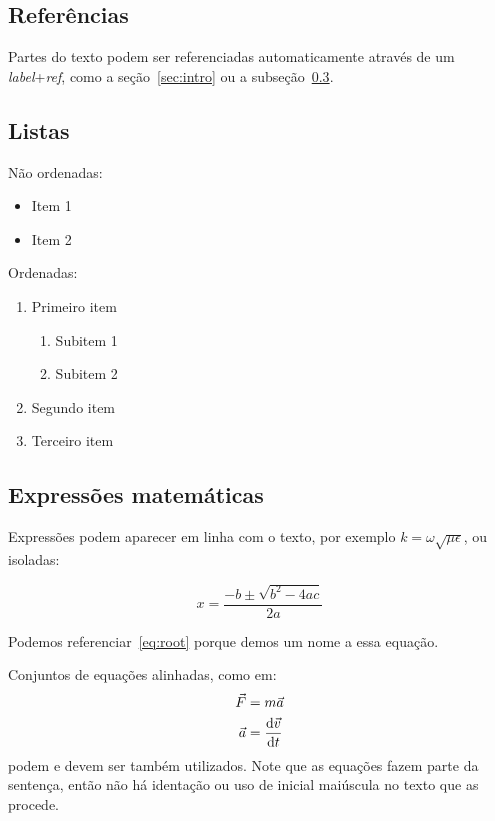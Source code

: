 \documentclass[a4paper,11pt]{article}
\begin{document}
\subsection{Referências}

Partes do texto podem ser referenciadas automaticamente através de um \emph{label}+\emph{ref}, como a seção~\ref{sec:intro} ou a subseção~\ref{ssec:math}.


\subsection{Listas}

Não ordenadas:

\begin{itemize}
	\item Item 1
	\item Item 2
\end{itemize}

Ordenadas:

\begin{enumerate}
	\item Primeiro item
	\begin{enumerate}
		\item Subitem 1
		\item Subitem 2
	\end{enumerate}
	\item Segundo item
	\item Terceiro item
\end{enumerate}


\subsection{Expressões matemáticas}
\label{ssec:math}

Expressões podem aparecer em linha com o texto, por exemplo $k = \omega \sqrt{\mu \epsilon}$, ou isoladas:

\begin{equation}
\label{eq:root}
x = \frac{-b \pm \sqrt{b^2 - 4ac}}{2a}
\end{equation}

Podemos referenciar~\eqref{eq:root} porque demos um nome a essa equação.

Conjuntos de equações alinhadas, como em:
%
\begin{align}
\vec{F} &= m \vec{a} \\
\vec{a} &= \frac{{\rm d}\vec{v}}{{\rm d}t}
\end{align}
%
podem e devem ser também utilizados.
Note que as equações fazem parte da sentença, então não há identação ou uso de inicial maiúscula no texto que as procede.
\end{document}
